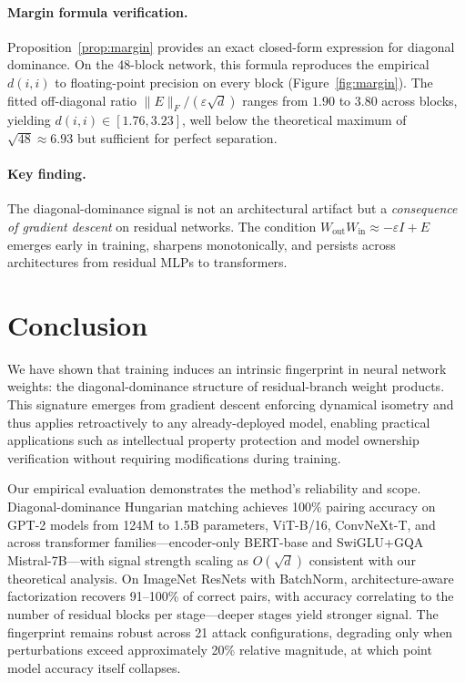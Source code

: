 \documentclass[wcp]{jmlr}
\begin{document}
\paragraph{Margin formula verification.}
Proposition~\ref{prop:margin} provides an exact closed-form expression for diagonal dominance. On the 48-block network, this formula reproduces the empirical $d(i,i)$ to floating-point precision on every block (Figure~\ref{fig:margin}). The fitted off-diagonal ratio $\|E\|_F/(\varepsilon\sqrt{d})$ ranges from $1.90$ to $3.80$ across blocks, yielding $d(i,i) \in [1.76, 3.23]$, well below the theoretical maximum of $\sqrt{48} \approx 6.93$ but sufficient for perfect separation.

\paragraph{Key finding.}
The diagonal-dominance signal is not an architectural artifact but a \emph{consequence of gradient descent} on residual networks. The condition $W_{\mathrm{out}}W_{\mathrm{in}} \approx -\varepsilon I + E$ emerges early in training, sharpens monotonically, and persists across architectures from residual MLPs to transformers.

\section{Conclusion}\label{sec:conclusion}

We have shown that training induces an intrinsic fingerprint in neural network weights: the diagonal-dominance structure of residual-branch weight products. This signature emerges from gradient descent enforcing dynamical isometry and thus applies retroactively to any already-deployed model, enabling practical applications such as intellectual property protection and model ownership verification without requiring modifications during training.

Our empirical evaluation demonstrates the method's reliability and scope. Diagonal-dominance Hungarian matching achieves 100\% pairing accuracy on GPT-2 models from 124M to 1.5B parameters, ViT-B/16, ConvNeXt-T, and across transformer families---encoder-only BERT-base and SwiGLU+GQA Mistral-7B---with signal strength scaling as $O(\sqrt{d})$ consistent with our theoretical analysis. On ImageNet ResNets with BatchNorm, architecture-aware factorization recovers 91--100\% of correct pairs, with accuracy correlating to the number of residual blocks per stage---deeper stages yield stronger signal. The fingerprint remains robust across 21 attack configurations, degrading only when perturbations exceed approximately 20\% relative magnitude, at which point model accuracy itself collapses.
\end{document}
